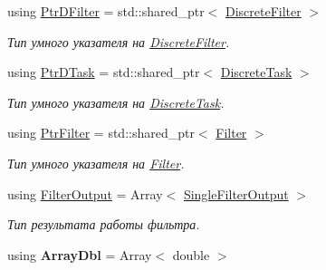 \begin{DoxyCompactItemize}
\hypertarget{namespace_core_a5bc2ef0a7d6facf16009f89297174aa6}{}\label{namespace_core_a5bc2ef0a7d6facf16009f89297174aa6} 
using \hyperlink{namespace_core_a5bc2ef0a7d6facf16009f89297174aa6}{Ptr\+D\+Filter} = std\+::shared\+\_\+ptr$<$ \hyperlink{class_core_1_1_discrete_filter}{Discrete\+Filter} $>$
\begin{DoxyCompactList}\small\item\em Тип умного указателя на \hyperlink{class_core_1_1_discrete_filter}{Discrete\+Filter}. \end{DoxyCompactList}\item 
\hypertarget{namespace_core_a9cd3f9b81303651b8d115031018f0ebf}{}\label{namespace_core_a9cd3f9b81303651b8d115031018f0ebf} 
using \hyperlink{namespace_core_a9cd3f9b81303651b8d115031018f0ebf}{Ptr\+D\+Task} = std\+::shared\+\_\+ptr$<$ \hyperlink{class_core_1_1_discrete_task}{Discrete\+Task} $>$
\begin{DoxyCompactList}\small\item\em Тип умного указателя на \hyperlink{class_core_1_1_discrete_task}{Discrete\+Task}. \end{DoxyCompactList}\item 
\hypertarget{namespace_core_afba80c2cb714c7d5793d9bcb9591e156}{}\label{namespace_core_afba80c2cb714c7d5793d9bcb9591e156} 
using \hyperlink{namespace_core_afba80c2cb714c7d5793d9bcb9591e156}{Ptr\+Filter} = std\+::shared\+\_\+ptr$<$ \hyperlink{class_core_1_1_filter}{Filter} $>$
\begin{DoxyCompactList}\small\item\em Тип умного указателя на \hyperlink{class_core_1_1_filter}{Filter}. \end{DoxyCompactList}\item 
\hypertarget{namespace_core_a60877581a235fc9566087b54d463ce9c}{}\label{namespace_core_a60877581a235fc9566087b54d463ce9c} 
using \hyperlink{namespace_core_a60877581a235fc9566087b54d463ce9c}{Filter\+Output} = Array$<$ \hyperlink{struct_core_1_1_single_filter_output}{Single\+Filter\+Output} $>$
\begin{DoxyCompactList}\small\item\em Тип результата работы фильтра. \end{DoxyCompactList}\item 
\hypertarget{namespace_core_afad0f3873edb3dbb0f2f845357db225d}{}\label{namespace_core_afad0f3873edb3dbb0f2f845357db225d} 
using {\bfseries Array\+Dbl} = Array$<$ double $>$
\item 
\hypertarget{namespace_core_a4811af8148ba137d644b9a61a042cf03}{}\label{namespace_core_a4811af8148ba137d644b9a61a042cf03} 

\end{DoxyCompactItemize}
